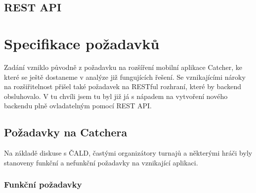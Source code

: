\documentclass[thesis=B,czech]{FITthesis}[2012/06/26]
\begin{document}
\section{REST API}


\chapter{Specifikace požadavků}

Zadání vzniklo původně z požadavku na rozšíření mobilní aplikace Catcher, ke které se ještě
dostaneme v analýze již fungujících řešení. Se vznikajícími nároky na rozšiřitelnost přišel
také požadavek na RESTful rozhraní, které by backend obsluhovalo. V tu chvíli jsem tu byl
již já s nápadem na vytvoření nového backendu plně ovladatelným pomocí REST API.

\section{Požadavky na Catchera}

\indent

Na základě diskuse s ČALD, častými organizátory turnajů a některými hráči byly stanoveny
funkční a nefunkční požadavky na vznikající aplikaci.

\subsection{Funkční požadavky}

\end{document}
